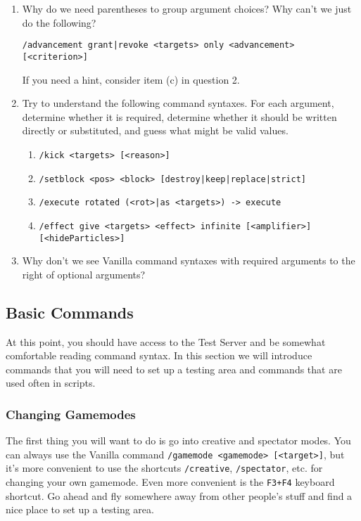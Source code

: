 \documentclass[oneside]{book}
\newenvironment{thinkbox}{%
    \begin{tcolorbox}[title=Stop and Think]%
    }{
    \end{tcolorbox}
    }
\begin{document}
\begin{thinkbox}
    \begin{enumerate}
        \item Why do we need parentheses to group argument choices? Why can't we just do the following?
        \begin{verbatim}
/advancement grant|revoke <targets> only <advancement> [<criterion>]\end{verbatim} 
        If you need a hint, consider item (c) in question 2.
        \item Try to understand the following command syntaxes. For each argument, determine whether it is required, determine whether it should be written directly or substituted, and guess what might be valid values.
        \begin{enumerate}
            \item \texttt{/kick <targets> [<reason>]}
            \item \texttt{/setblock <pos> <block> [destroy|keep|replace|strict]}
            \item \texttt{/execute rotated (<rot>|as <targets>) -> execute}
            \item \texttt{/effect give <targets> <effect> infinite [<amplifier>]} \\
            \texttt{[<hideParticles>]}
        \end{enumerate}
        \item Why don't we see Vanilla command syntaxes with required arguments to the right of optional arguments?
    \end{enumerate}
\end{thinkbox}

\subsection{Basic Commands}

At this point, you should have access to the Test Server and be somewhat comfortable reading command syntax. In this section we will introduce commands that you will need to set up a testing area and commands that are used often in scripts.

\subsubsection*{Changing Gamemodes}

The first thing you will want to do is go into creative and spectator modes. You can always use the Vanilla command \texttt{/gamemode <gamemode> [<target>]}, but it's more convenient to use the shortcuts \texttt{/creative}, \texttt{/spectator}, etc. for changing your own gamemode. Even more convenient is the \texttt{F3+F4} keyboard shortcut. Go ahead and fly somewhere away from other people's stuff and find a nice place to set up a testing area.
\end{document}
